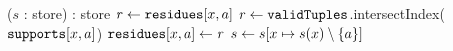         \PROCEDURE \FilterDomains($s$ : store) : store     \label{line:filterDom:0}
       \label{line:filterDom:2}
             \label{line:filterDom:3}
              \STATE $\mathit{r} \leftarrow \texttt{residues}[x,a]$ \label{line:filterDom:res1}
               \label{line:filterDom:res2} %
                  \STATE $\mathit{r} \leftarrow \texttt{validTuples}$.intersectIndex($\texttt{supports}[x,a]$) \label{line:filterDom:4}
                   \label{line:filterDom:5}
                        \STATE $\texttt{residues}[x,a] \leftarrow \mathit{r}$ \label{line:filterDom:6}
                  \ELSE
                        \STATE $s \leftarrow s[x \mapsto s(x) \setminus \left\{a\right\}]$ \label{line:filterDom:7}
                  \ENDIF
              \ENDIF
             \ENDFOREACH

      \ENDFOREACH
